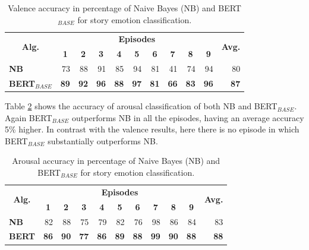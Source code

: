 \begin{table}[!h]
\centering
\setlength{\tabcolsep}{4pt}
\begin{tabular}{crrrrrrrrrr}
\toprule
\multirow{2}{*}{\textbf{Alg.}} & \multicolumn{9}{c}{\textbf{Episodes}} & \multirow{2}{*}{\textbf{Avg.}} \\
\cmidrule{2-10}
& \multicolumn{1}{c}{\textbf{1}}   & \multicolumn{1}{c}{\textbf{2}}   & \multicolumn{1}{c}{\textbf{3}}  & \multicolumn{1}{c}{\textbf{4}} & \multicolumn{1}{c}{\textbf{5}}  & \multicolumn{1}{c}{\textbf{6}}  & \multicolumn{1}{c}{\textbf{7}} & \multicolumn{1}{c}{\textbf{8}}  & \multicolumn{1}{c}{\textbf{9}} &    \\
\midrule
\multicolumn{1}{l}{\textbf{NB}}   &   73 & 88  &  91 & 85   &  94 & 81  &  41 & 74   & 94    &   80 \\
\multicolumn{1}{l}{\textbf{BERT$_{BASE}$}}   &  \textbf{89}  & \textbf{92}  & \textbf{96}  &  \textbf{88} & \textbf{97}   & \textbf{81} & \textbf{66}   &  \textbf{83}   &  \textbf{96} &  \textbf{87}  \\
\bottomrule
\end{tabular}
\caption{Valence accuracy in percentage of Naive Bayes (NB) and BERT$_{BASE}$ for story emotion classification.}
\label{tab:valence}
\end{table}

Table \ref{tab:arousal} shows the accuracy of arousal classification of both NB and BERT$_{BASE}$. Again BERT$_{BASE}$ outperforms NB in all the episodes, having an average accuracy 5\% higher. In contrast with the valence results, here there is no episode in which BERT$_{BASE}$ substantially outperforms NB.

\begin{table}[!h]
\centering
\setlength{\tabcolsep}{4pt}
\begin{tabular}{crrrrrrrrrr}
\toprule
\multirow{2}{*}{\textbf{Alg.}} & \multicolumn{9}{c}{\textbf{Episodes}} & \multirow{2}{*}{\textbf{Avg.}} \\
\cmidrule{2-10}
& \multicolumn{1}{c}{\textbf{1}}   & \multicolumn{1}{c}{\textbf{2}}   & \multicolumn{1}{c}{\textbf{3}}  & \multicolumn{1}{c}{\textbf{4}} & \multicolumn{1}{c}{\textbf{5}}  & \multicolumn{1}{c}{\textbf{6}}  & \multicolumn{1}{c}{\textbf{7}} & \multicolumn{1}{c}{\textbf{8}}  & \multicolumn{1}{c}{\textbf{9}} &    \\
\midrule
\multicolumn{1}{l}{\textbf{NB}}  & 82 & 88  &  75 & 79   &  82 & 76  &  98 & 86   & 84    &   83 \\
\multicolumn{1}{l}{\textbf{BERT}}   &  \textbf{86}  & \textbf{90}  & \textbf{77}  &  \textbf{86} & \textbf{89}   & \textbf{88} & \textbf{99}   &  \textbf{90}   &  \textbf{88} &  \textbf{88}  \\
\bottomrule
\end{tabular}
\caption{Arousal accuracy in percentage of Naive Bayes (NB) and BERT$_{BASE}$ for story emotion classification.}
\label{tab:arousal}
\end{table}

